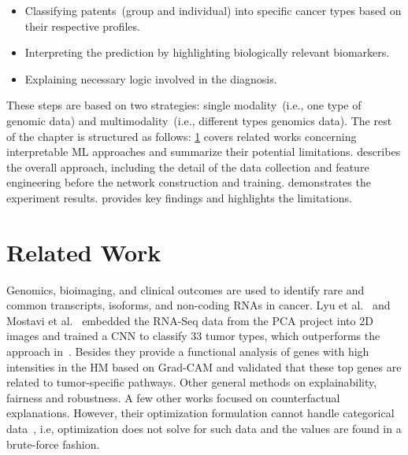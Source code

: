 \begin{itemize}[noitemsep]
\vspace{-2mm}
    \item Classifying patents~(group and individual) into specific cancer types based on their respective profiles.
    \item Interpreting the prediction by highlighting biologically relevant biomarkers.
    \item Explaining necessary logic involved in the diagnosis. 
    \vspace{-2mm}
\end{itemize}

\hspace*{3.5mm} These steps are based on two strategies: single modality~(i.e., one type of genomic data) and multimodality~(i.e., different types genomics data). 
The rest of the chapter is structured as follows: \cref{chapter_5:rw} covers related works concerning interpretable ML approaches and summarize their potential limitations.  describes the overall approach, including the detail of the data collection and feature engineering before the network construction and training.  demonstrates the experiment results.  provides key findings and highlights the limitations. %

\section{Related Work}\label{chapter_5:rw}
Genomics, bioimaging, and clinical outcomes are used to identify rare and common transcripts, isoforms, and non-coding RNAs in cancer. 
Lyu et al.~\cite{lyu2018deep} and Mostavi et al.~\cite{mostavi2019convolutional} embedded the RNA-Seq data from the PCA project into 2D images and trained a CNN to classify 33 tumor types, which outperforms the approach in~\cite{li2017comprehensive}. Besides they provide a functional analysis of genes with high intensities in the HM based on Grad-CAM and validated that these top genes are related to tumor-specific pathways. Other general methods on explainability, fairness and robustness. 
A few other works focused on counterfactual explanations. However, their optimization formulation cannot handle categorical data~\cite{ying2019gnnexplainer}, i.e, optimization does not solve for such data and the values are found in a brute-force fashion.

